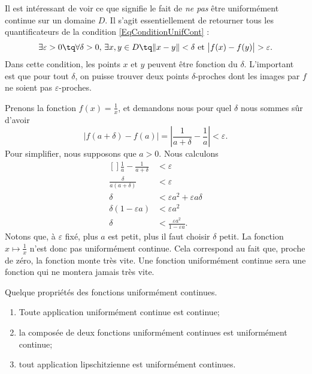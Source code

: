 Il est intéressant de voir ce que signifie le fait de \emph{ne pas} être uniformément continue sur un domaine $D$. Il s'agit essentiellement de retourner tous les quantificateurs de la condition \eqref{EqConditionUnifCont} :
\begin{equation}	\label{EqConditionPasUnifCont}
	\exists\varepsilon>0\tq\forall\delta>0,\,\exists x,y\in D\tq \| x-y \|<\delta\text{ et }\big| f(x)-f(y) \big|>\varepsilon.
\end{equation}
Dans cette condition, les points $x$ et $y$ peuvent être fonction du $\delta$. L'important est que pour tout $\delta$, on puisse trouver deux points $\delta$-proches dont les images par $f$ ne soient pas $\varepsilon$-proches.

\begin{example}
	Prenons la fonction $f(x)=\frac{1}{ x }$, et demandons nous pour quel $\delta$ nous sommes sûr d'avoir
	\begin{equation}
		| f(a+\delta)-f(a) |=\left| \frac{1}{ a+\delta }-\frac{1}{ a } \right| <\varepsilon.
	\end{equation}
	Pour simplifier, nous supposons que $a>0$. Nous calculons
	\begin{equation}
		\begin{aligned}[]
			\frac{ 1 }{ a }-\frac{1}{ a+\delta }&<	\varepsilon\\
			\frac{ \delta }{ a(a+\delta) }&<\varepsilon\\
			\delta&<\varepsilon a^2+\varepsilon a\delta\\
			\delta(1-\varepsilon a)&<\varepsilon a^2\\
			\delta&<\frac{ \varepsilon a^2 }{ 1-\varepsilon a }.
		\end{aligned}
	\end{equation}
	Notons que, à $\varepsilon$ fixé, plus $a$ est petit, plus il faut choisir $\delta$ petit. La fonction $x\mapsto\frac{1}{ x }$ n'est donc pas uniformément continue. Cela correspond au fait que, proche de zéro, la fonction monte très vite. Une fonction uniformément continue sera une fonction qui ne montera jamais très vite.
\end{example}

\begin{proposition}
	Quelque propriétés des fonctions uniformément continues.
	\begin{enumerate}
		\item
			Toute application uniformément continue est continue;
		\item
			la composée de deux fonctions uniformément continues est uniformément continue;
		\item
			tout application lipschitzienne est uniformément continues.
	\end{enumerate}
\end{proposition}

